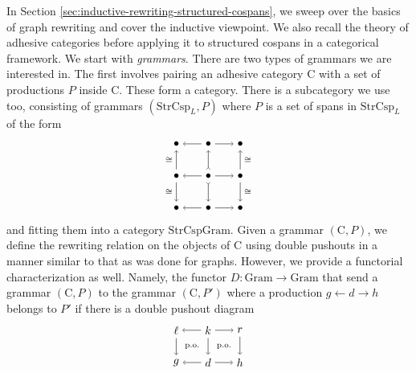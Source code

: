 \documentclass{amsart}
\newcommand{\iso}{\cong}
\newcommand{\C}{\cat{C}}
\newcommand{\Gram}{\cat{Gram}}
\newcommand{\StrCsp}{\cat{StrCsp}}
\newcommand{\StrCspGram}{\cat{StrCspGram}}
\newcommand{\cat}[1]{\mathrm{#1}}
\newcommand{\from}{\colon}
\renewcommand{\gets}{\leftarrow}
\theoremstyle{remark}
\theoremstyle{definition}
\begin{document}
In Section \ref{sec:inductive-rewriting-structured-cospans}, we sweep
over the basics of graph rewriting and cover the inductive viewpoint.
We also recall the theory of adhesive categories before applying it to
structured cospans in a categorical framework. We start with
\emph{grammars}. There are two types of grammars we are interested in.
The first involves pairing an adhesive category $ \C $ with a set of
productions $ P $ inside $ \C $. These form a category.  There is a
subcategory we use too, consisting of grammars $ ( \StrCsp_L , P ) $
where $ P $ is a set of spans in $ \StrCsp_L $ of the form
%
\[
  \begin{tikzpicture}
    \node (1t) at (0,2) {$ \bullet $};
    \node (2t) at (1,2) {$ \bullet $};
    \node (3t) at (2,2) {$ \bullet $};
    \node (1m) at (0,1) {$ \bullet $};
    \node (2m) at (1,1) {$ \bullet $};
    \node (3m) at (2,1) {$ \bullet $};
    \node (1b) at (0,0) {$ \bullet $};
    \node (2b) at (1,0) {$ \bullet $};
    \node (3b) at (2,0) {$ \bullet $};
    \draw [->] (2t) to node [] {\scriptsize{$  $}} (1t);
    \draw [->] (2t) to node [] {\scriptsize{$  $}} (3t);
    \draw [->] (2m) to node [] {\scriptsize{$  $}} (1m);
    \draw [->] (2m) to node [] {\scriptsize{$  $}} (3m);
    \draw [->] (2b) to node [] {\scriptsize{$  $}} (1b);
    \draw [->] (2b) to node [] {\scriptsize{$  $}} (3b);
    \draw [->] (1m) to node [left] {\scriptsize{$ \iso $}} (1t);
    \draw [->] (1m) to node [left] {\scriptsize{$ \iso $}} (1b);
    \draw [>->] (2m) to node [] {\scriptsize{$  $}} (2t);
    \draw [>->] (2m) to node [] {\scriptsize{$  $}} (2b);
    \draw [->] (3m) to node [right] {\scriptsize{$ \iso $}} (3t);
    \draw [->] (3m) to node [right] {\scriptsize{$ \iso $}} (3b);
  \end{tikzpicture}
\]
% 
and fitting them into a category $ \StrCspGram $.  Given a grammar
$ ( \C , P ) $, we define the rewriting relation on the objects
of $ \C $ using double pushouts in a manner similar to that as
was done for graphs.  However, we provide a functorial characterization
as well. Namely, the functor $ D \from \Gram \to \Gram $
that send a grammar $ ( \C , P ) $ to the grammar $ ( \C
, P') $ where a production $ g \gets d \to h $ belongs to $ P' $ if
there is a double pushout diagram
%
\[
  \begin{tikzpicture}
    \node (1t) at (0,1) {$ \ell $};
    \node (2t) at (1,1) {$ k $};
    \node (3t) at (2,1) {$ r $};
    \node (1b) at (0,0) {$ g $};
    \node (2b) at (1,0) {$ d $};
    \node (3b) at (2,0) {$ h $};
    \draw [->] (2t) to node [] {\scriptsize{$  $}} (1t);
    \draw [->] (2t) to node [] {\scriptsize{$  $}} (3t);
    \draw [->] (2b) to node [] {\scriptsize{$  $}} (1b);
    \draw [->] (2b) to node [] {\scriptsize{$  $}} (3b);
    \draw [->] (1t) to node [] {\scriptsize{$  $}} (1b);
    \draw [->] (2t) to node [] {\scriptsize{$  $}} (2b);
    \draw [->] (3t) to node [] {\scriptsize{$  $}} (3b);
    \node () at (0.5,0.5) {\scriptsize{p.o.}};
    \node () at (1.5,0.5) {\scriptsize{p.o.}};
  \end{tikzpicture}
\]
\end{document}
